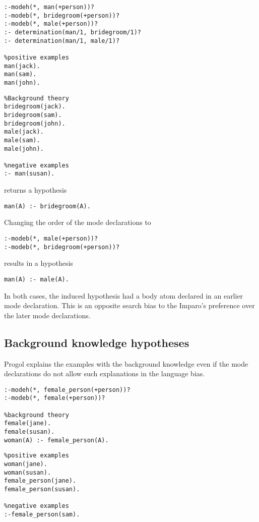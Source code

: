\begin{minipage}[t]{.60\textwidth}
\begin{lstlisting}
:-modeh(*, man(+person))?
:-modeb(*, bridegroom(+person))?
:-modeb(*, male(+person))?
:- determination(man/1, bridegroom/1)?
:- determination(man/1, male/1)?

%positive examples
man(jack).
man(sam).
man(john).
\end{lstlisting}
\end{minipage}
\begin{minipage}[t]{.20\textwidth}
\begin{lstlisting}
%Background theory
bridegroom(jack).
bridegroom(sam).
bridegroom(john).
male(jack).
male(sam).
male(john).

%negative examples
:- man(susan).
\end{lstlisting}
\end{minipage}

returns a hypothesis
\begin{lstlisting}
man(A) :- bridegroom(A).
\end{lstlisting}

Changing the order of the mode declarations to
\begin{lstlisting}
:-modeb(*, male(+person))?
:-modeb(*, bridegroom(+person))?
\end{lstlisting}
results in a hypothesis
\begin{lstlisting}
man(A) :- male(A).
\end{lstlisting}
In both cases, the induced hypothesis had a body atom declared in an earlier mode declaration. This is an opposite search bias to the Imparo's preference over the later mode declarations.

\subsection{Background knowledge hypotheses}
Progol explains the examples with the background knowledge even if the mode declarations do not allow such explanations in the language bias.

\begin{minipage}[t]{.60\textwidth}
\begin{lstlisting}
:-modeh(*, female_person(+person))?
:-modeb(*, female(+person))?

%background theory
female(jane).
female(susan).
woman(A) :- female_person(A).
\end{lstlisting}
\end{minipage}
\begin{minipage}[t]{.20\textwidth}
\begin{lstlisting}
%positive examples
woman(jane).
woman(susan).
female_person(jane).
female_person(susan).

%negative examples
:-female_person(sam).
\end{lstlisting}
\end{minipage}

